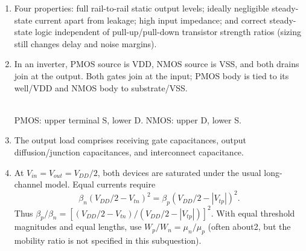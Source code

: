 \documentclass[10pt]{article}
\newcommand{\mos}[4]{\begin{scope}[shift={(#1,#2)}]
\draw (0,.24)--(0,-.24);\draw (0,.20)--(.25,.20)--(.25,.5);
\draw (0,-.20)--(.25,-.20)--(.25,-.5);\draw (-.16,.23)--(-.16,-.23);
\ifnum#4=1\draw (-.26,0) circle (.06);\draw (-.75,0)--(-.32,0);\else\draw (-.75,0)--(-.16,0);\fi
\node[anchor=east,font=\scriptsize] at (-.76,0) {$#3$};\end{scope}}
\begin{document}
\begin{enumerate}[label=(\alph*),leftmargin=7mm,itemsep=4pt]
\begin{center}
\end{center}
\item Four properties: full rail-to-rail static output levels; ideally negligible steady-state current apart from leakage; high input impedance; and correct steady-state logic independent of pull-up/pull-down transistor strength ratios (sizing still changes delay and noise margins).
\item In an inverter, PMOS source is VDD, NMOS source is VSS, and both drains join at the output. Both gates join at the input; PMOS body is tied to its well/VDD and NMOS body to substrate/VSS.
\begin{center}\\PMOS: upper terminal S, lower D. NMOS: upper D, lower S.\end{center}
\item The output load comprises receiving gate capacitances, output diffusion/junction capacitances, and interconnect capacitance.
\item At $V_{in}=V_{out}=V_{DD}/2$, both devices are saturated under the usual long-channel model. Equal currents require
\[\beta_n(V_{DD}/2-V_{tn})^2=\beta_p(V_{DD}/2-|V_{tp}|)^2.\]
Thus $\beta_p/\beta_n=[(V_{DD}/2-V_{tn})/(V_{DD}/2-|V_{tp}|)]^2$. With equal threshold magnitudes and equal lengths, use $W_p/W_n=\mu_n/\mu_p$ (often about2, but the mobility ratio is not specified in this subquestion).
\end{enumerate}
\end{document}
